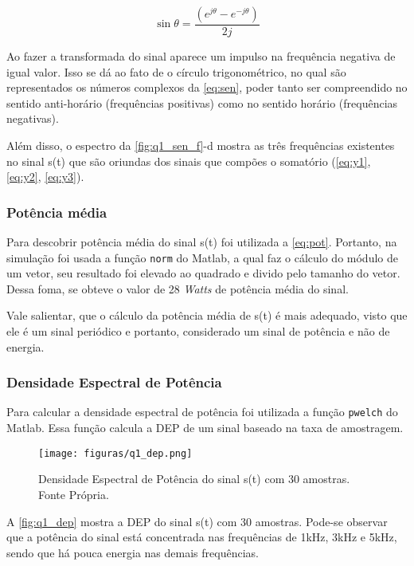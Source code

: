 \documentclass[11pt]{classes/ifscarticle}
\begin{document}
 \begin{equation}
     \sin \theta = \frac{(e^{j\theta} - e^{-j\theta})}{2j}
     \label{eq:sen}
 \end{equation}

Ao fazer a transformada do sinal aparece um impulso na frequência negativa de igual valor. Isso se dá ao fato de o círculo trigonométrico, no qual são representados os números complexos da \autoref{eq:sen}, poder tanto ser compreendido no sentido anti-horário (frequências positivas) como no sentido horário (frequências negativas).

Além disso, o espectro da \autoref{fig:q1_sen_f}-d mostra as três frequências existentes no sinal s(t) que são oriundas dos sinais que compões o somatório (\autoref{eq:y1}, \autoref{eq:y2}, \autoref{eq:y3}).

\subsubsection{Potência média}

Para descobrir potência média do sinal s(t) foi utilizada a \autoref{eq:pot}. Portanto, na simulação foi usada a função \texttt{norm} do Matlab, a qual faz o cálculo do módulo de um vetor, seu resultado foi elevado ao quadrado e divido pelo tamanho do vetor. Dessa foma, se obteve o valor de 28 \textit{Watts} de potência média do sinal.

Vale salientar, que o cálculo da potência média de s(t) é mais adequado, visto que ele é um sinal periódico e portanto, considerado um sinal de potência e não de energia.

\subsubsection{Densidade Espectral de Potência}

Para calcular a densidade espectral de potência foi utilizada a função \texttt{pwelch} do Matlab. Essa função calcula a DEP de um sinal baseado na taxa de amostragem.

\begin{figure}[ht]
    \centering
    \texttt{[image: figuras/q1\_dep.png]}
    \caption{Densidade Espectral de Potência do sinal s(t) com 30 amostras. Fonte Própria.}
    \label{fig:q1_dep}
\end{figure}

A \autoref{fig:q1_dep} mostra a DEP do sinal s(t) com 30 amostras. Pode-se observar que a potência do sinal está concentrada nas frequências de 1kHz, 3kHz e 5kHz, sendo que há pouca energia nas demais frequências. 
\end{document}
